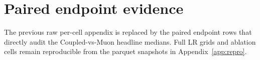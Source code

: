 \section{Paired endpoint evidence}\label{app:paired-endpoints}

The previous raw per-cell appendix is replaced by the paired endpoint rows that
directly audit the Coupled-vs-Muon headline medians. Full LR grids and ablation
cells remain reproducible from the parquet snapshots in Appendix~\ref{app:repro}.

\begin{small}
\end{small}
